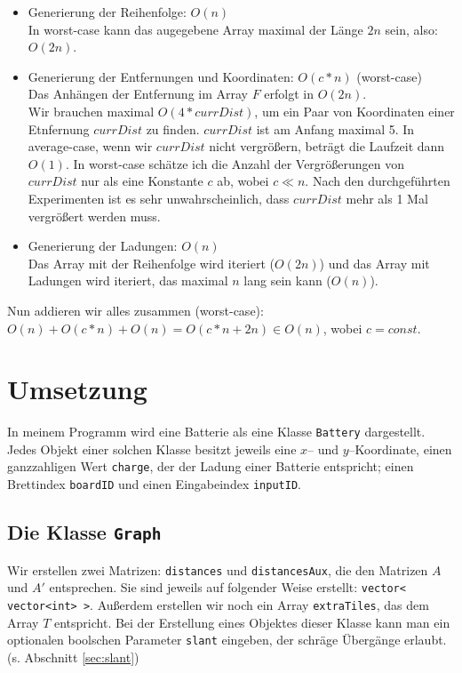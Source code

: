 \documentclass[a4paper,10pt,ngerman]{scrartcl}
\begin{document}
\begin{itemize}
  \item Generierung der Reihenfolge: $O(n)$\\
  In worst-case kann das augegebene Array maximal der Länge $2n$ sein, also: $O(2n)$.
  \item Generierung der Entfernungen und Koordinaten: $O(c*n)$ (worst-case)\\
  Das Anhängen der Entfernung im Array $F$ erfolgt in $O(2n)$.\\
  Wir brauchen maximal $O(4*currDist)$, um ein Paar von Koordinaten einer Etnfernung $currDist$
  zu finden. $currDist$ ist am Anfang maximal 5. In average-case, wenn wir $currDist$ nicht vergrößern,
  beträgt die Laufzeit dann $O(1)$. In worst-case schätze ich die Anzahl der Vergrößerungen von $currDist$
  nur als eine Konstante $c$ ab, wobei $c \ll n$. Nach den durchgeführten Experimenten ist es sehr unwahrscheinlich,
  dass $currDist$ mehr als 1 Mal vergrößert werden muss.
  \item Generierung der Ladungen: $O(n)$\\
  Das Array mit der Reihenfolge wird iteriert ($O(2n)$) und das Array mit Ladungen wird iteriert,
  das maximal $n$ lang sein kann ($O(n)$).
\end{itemize}

Nun addieren wir alles zusammen (worst-case):\\
$O(n) + O(c*n) + O(n) = O(c*n + 2n) \in O(n)$, wobei $c = const.$\\


\newpage
\section{Umsetzung}
In meinem Programm wird eine Batterie als eine Klasse \texttt{Battery} dargestellt.
Jedes Objekt einer solchen Klasse besitzt jeweils eine $x$-- und $y$--Koordinate,
einen ganzzahligen Wert \texttt{charge}, der der Ladung einer Batterie entspricht;
einen Brettindex \texttt{boardID} und einen Eingabeindex \texttt{inputID}.

\subsection{Die Klasse \texttt{Graph}}
Wir erstellen zwei Matrizen: \texttt{distances} und \texttt{distancesAux}, die den Matrizen 
$A$ und $A'$ entsprechen. Sie sind jeweils auf folgender Weise erstellt: \texttt{vector< vector<int> >}.
Außerdem erstellen wir noch ein Array \texttt{extraTiles}, das dem Array $T$ entspricht.
Bei der Erstellung eines Objektes dieser Klasse kann man ein optionalen boolschen Parameter \texttt{slant}
eingeben, der schräge Übergänge erlaubt. (s. Abschnitt \ref{sec:slant}) \\
\end{document}
